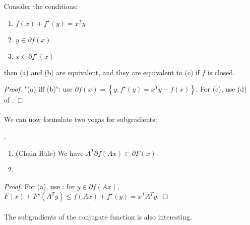 \begin{prop}\label{prop:046-subgrad-conjugate}
	Consider the conditions:
	\begin{enumerate}[label=(\alph*)]
		\item $f(x) + f^\star(y) = x^Ty$
		\item $y\in \partial f(x)$
		\item $x\in \partial f^\star(x)$
	\end{enumerate}
	then (a) and (b) are equivalent, and they are equivalent to (c) if $f$ is closed.
\end{prop}

\begin{proof}
	"(a) iff (b)": use $\partial f(x) = \left\{y:f^\star(y)=x^Ty-f(x)\right\}$. For (c), use (d) of .
\end{proof}

\paragraph{}We can now formulate two yogas for subgradients:

\begin{prop}\label{prop:046-yoga-subgradients}.
	\begin{enumerate}[label=(\alph*)]
		\item (Chain Rule) We have $A^T\partial f(Ax)\subset \partial F(x)$.
		\item
	\end{enumerate}
\end{prop}

\begin{proof}
	For (a), use : for $y\in \partial f(Ax)$, $F(x)+F^\star(A^Ty)\leq f(Ax)+f^\star(y)=x^TA^Ty$.
\end{proof}

\paragraph{}The subgradients of the conjugate function is also interesting.

